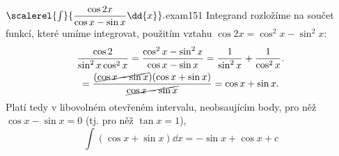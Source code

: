 \begin{mathexam}{\(\scalerel{\int}{\dfrac{\cos2x}{\cos x - \sin x}\dd{x}}.\)}{exam151} 
  Integrand rozložíme na součet funkcí, které umíme integrovat, použitím vztahu \(\cos2x=\cos^2x -
  \sin^2x\): 
  \begin{multline*}
    \dfrac{\cos2}{\sin^2x\cos^2x} 
      = \dfrac{\cos^2x - \sin^2x}{\cos x - \sin x} = \dfrac{1}{\sin^2x} + \dfrac{1}{\cos^2x}. \\
      = \dfrac{(\cancel{\cos x - \sin x})(\cos x + \sin x)}{\cancel{\cos x - \sin x}} 
      = \cos x + \sin x.  
  \end{multline*}
  Platí tedy v libovolném otevřeném intervalu, neobsaujícím body, pro něž \(\cos x - \sin x = 0\)
  (tj. pro něž \(\tan x = 1\)),
  \begin{equation*}
    \int(\cos x + \sin x)\dd{x} = -\sin x + \cos x + c 
  \end{equation*}
  \vspace{-4mm}
\end{mathexam}